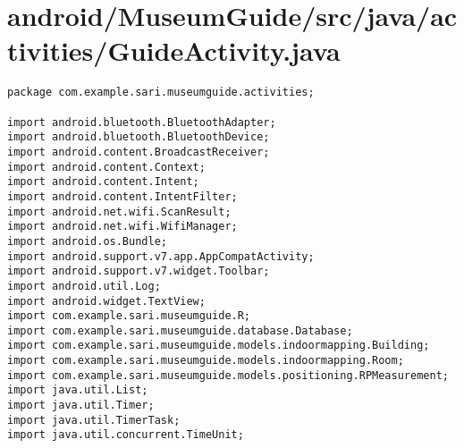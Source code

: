 \section{android/MuseumGuide/src/java/activities/GuideActivity.java}
\begin{lstlisting}package com.example.sari.museumguide.activities;

import android.bluetooth.BluetoothAdapter;
import android.bluetooth.BluetoothDevice;
import android.content.BroadcastReceiver;
import android.content.Context;
import android.content.Intent;
import android.content.IntentFilter;
import android.net.wifi.ScanResult;
import android.net.wifi.WifiManager;
import android.os.Bundle;
import android.support.v7.app.AppCompatActivity;
import android.support.v7.widget.Toolbar;
import android.util.Log;
import android.widget.TextView;
import com.example.sari.museumguide.R;
import com.example.sari.museumguide.database.Database;
import com.example.sari.museumguide.models.indoormapping.Building;
import com.example.sari.museumguide.models.indoormapping.Room;
import com.example.sari.museumguide.models.positioning.RPMeasurement;
import java.util.List;
import java.util.Timer;
import java.util.TimerTask;
import java.util.concurrent.TimeUnit;


\end{lstlisting}

